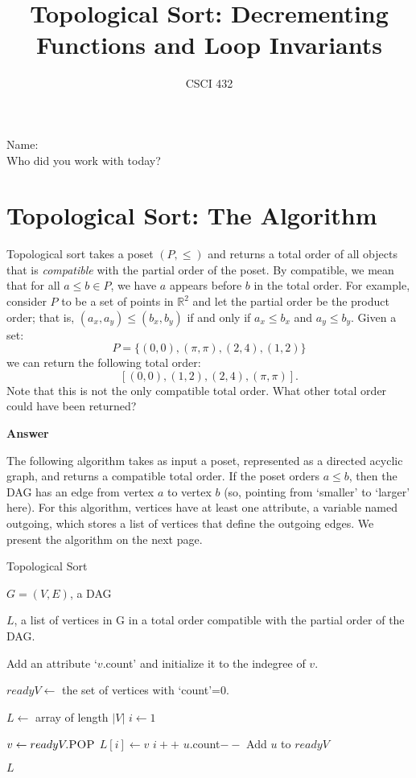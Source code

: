 \documentclass{article}
\title{Topological Sort: Decrementing Functions and Loop Invariants}
\author{CSCI 432}
\def\R{{\mathbb R}}
\begin{document}
\maketitle

\noindent
Name:\\
Who did you work with today?

\section*{Topological Sort: The Algorithm}

Topological sort takes a poset $(P,\leq)$ and returns a total order of all
objects that is \emph{compatible} with the partial order of the poset.  By
compatible, we mean that for all $a \leq b \in P$, we have $a$ appears before
$b$ in the total order.  For example, consider $P$ to be a set of points in
$\R^2$ and let the partial order be the product order; that is, $(a_x,a_y) \leq
(b_x,b_y)$ if and only if $a_x \leq b_x$ and $a_y \leq b_y$.  Given a set:
$$ P = \{ (0,0), (\pi, \pi), (2,4), (1,2) \}$$
we can return the following total order:
$$[ (0,0), (1,2), (2,4), (\pi, \pi)].$$
Note that this is not the only compatible total order.  What other total order
could have been returned?

\textbf{Answer}
\vspace{1in}

The following algorithm takes as input a poset, represented as a directed
acyclic graph, and returns a compatible total order.  If the poset orders $a
\leq b$, then the DAG has an edge from vertex $a$ to vertex $b$ (so, pointing
from `smaller' to `larger' here).  For this
algorithm, vertices have at least one attribute, a variable named outgoing, which stores a list
of vertices that define the outgoing edges. We present the algorithm on the next
page.

\begin{algorithm}[h]
    \caption{Topological Sort}
    \begin{algorithmic}[1]
        \REQUIRE $G=(V,E)$, a DAG

        \ENSURE $L$, a list of vertices in G in a total order compatible with
        the partial order of the DAG.

            \STATE Add an attribute `$v$.count' and initialize it to the indegree of $v$.
        \ENDFOR

        \STATE $readyV \gets$ the set of vertices with `count'=0.\label{ln:initQ}

        \STATE $L \gets$ array of length $|V|$
        \STATE $i \gets 1$

            \STATE $v \gets readyV.\textsc{POP}$
            \STATE $L[i] \gets v$
            \STATE $i++$
                \STATE $u$.count$--$
                    \STATE Add $u$ to $readyV$
                \ENDIF
            \ENDFOR
        \ENDWHILE

        \RETURN $L$
    \end{algorithmic}
\end{algorithm}
\end{document}
